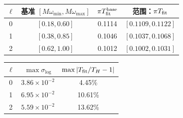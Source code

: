 \documentclass[UTF8,fontset=fandol,12pt,a4paper,oneside,openany]{ctexrep}
\begin{document}
\noindent\begin{minipage}{\linewidth}
\captionsetup{type=table}\caption{高频有限窗指数拟合与缩窗漂移。}\label{audit:tab:tail-window}
\centering\fontsize{10.5}{14}\selectfont
\setlength{\tabcolsep}{6pt}\renewcommand{\arraystretch}{1.2}
\par{}\par\smallskip
\begin{tabular}{cccc}\toprule
$\ell$ & 基准 $[M\omega_{\min},M\omega_{\max}]$ & $\pi T_{\rm fit}^{\rm base}$ & 范围：$\pi T_{\rm fit}$\\\midrule
0 & $[0.18,0.60]$ & 0.1114 & $[0.1109,0.1122]$\\
1 & $[0.38,0.85]$ & 0.1046 & $[0.1037,0.1068]$\\
2 & $[0.62,1.00]$ & 0.1012 & $[0.1002,0.1031]$\\
\bottomrule\end{tabular}
\par\medskip
\par{}\par\smallskip
\begin{tabular}{ccc}\toprule
$\ell$ & $\max\sigma_{\log}$ & $\max|T_{\rm fit}/T_H-1|$\\\midrule
0 & $3.86\times10^{-2}$ & 4.45\%\\
1 & $6.95\times10^{-2}$ & 10.61\%\\
2 & $5.59\times10^{-2}$ & 13.62\%\\
\bottomrule\end{tabular}
\end{minipage}\par\addvspace{10pt}
\par\addvspace{14pt}
\end{document}
